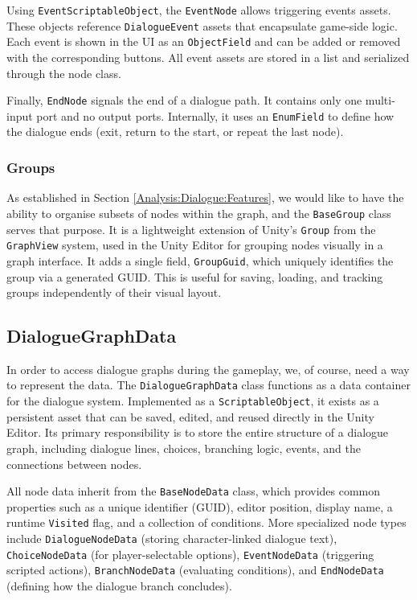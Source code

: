 Using \verb|EventScriptableObject|, the \verb|EventNode| allows triggering events assets. These objects reference \verb|DialogueEvent| assets that encapsulate game-side logic. Each event is shown in the UI as an \verb|ObjectField| and can be added or removed with the corresponding buttons. All event assets are stored in a list and serialized through the node class.

Finally, \verb|EndNode| signals the end of a dialogue path. It contains only one multi-input port and no output ports. Internally, it uses an \verb|EnumField| to define how the dialogue ends (exit, return to the start, or repeat the last node). 
 

\subsubsection{Groups}
As established in Section \ref{Analysis:Dialogue:Features}, we would like to have the ability to organise subsets of nodes within the graph, and the \verb|BaseGroup| class serves that purpose. It is a lightweight extension of Unity’s \verb|Group| from the \verb|GraphView| system, used in the Unity Editor for grouping nodes visually in a graph interface. It adds a single field, \verb|GroupGuid|, which uniquely identifies the group via a generated GUID. This is useful for saving, loading, and tracking groups independently of their visual layout.


\subsection{DialogueGraphData}
\label{devlog:DialogueGraphData}
In order to access dialogue graphs during the gameplay, we, of course, need a way to represent the data. The \verb|DialogueGraphData| class functions as a data container for the dialogue system. Implemented as a \verb|ScriptableObject|, it exists as a persistent asset that can be saved, edited, and reused directly in the Unity Editor. Its primary responsibility is to store the entire structure of a dialogue graph, including dialogue lines, choices, branching logic, events, and the connections between nodes.

All node data inherit from the \verb|BaseNodeData| class, which provides common properties such as a unique identifier (GUID), editor position, display name, a runtime \verb|Visited| flag, and a collection of conditions. More specialized node types include \verb|DialogueNodeData| (storing character-linked dialogue text), \verb|ChoiceNodeData| (for player-selectable options), \verb|EventNodeData| (triggering scripted actions), \verb|BranchNodeData| (evaluating conditions), and \verb|EndNodeData| (defining how the dialogue branch concludes).

